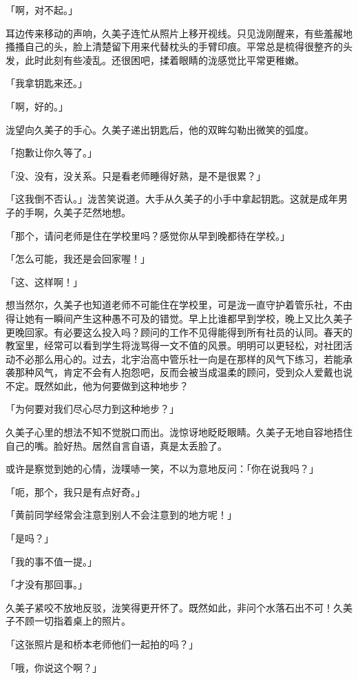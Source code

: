 \documentclass[UTF8]{ctexart}
\begin{document}
    「啊，对不起。」 

    耳边传来移动的声响，久美子连忙从照片上移开视线。只见泷刚醒来，有些羞赧地搔搔自己的头，脸上清楚留下用来代替枕头的手臂印痕。平常总是梳得很整齐的头发，此时此刻有些凌乱。还很困吧，揉着眼睛的泷感觉比平常更稚嫩。 

    「我拿钥匙来还。」 

    「啊，好的。」 

    泷望向久美子的手心。久美子递出钥匙后，他的双眸勾勒出微笑的弧度。 

    「抱歉让你久等了。」 

    「没、没有，没关系。只是看老师睡得好熟，是不是很累？」 

    「这我倒不否认。」泷苦笑说道。大手从久美子的小手中拿起钥匙。这就是成年男子的手啊，久美子茫然地想。 

    「那个，请问老师是住在学校里吗？感觉你从早到晚都待在学校。」 

    「怎么可能，我还是会回家喔！」 

    「这、这样啊！」 

    想当然尔，久美子也知道老师不可能住在学校里，可是泷一直守护着管乐社，不由得让她有一瞬间产生这种愚不可及的错觉。早上比谁都早到学校，晚上又比久美子更晚回家。有必要这么投入吗？顾问的工作不见得能得到所有社员的认同。春天的教室里，经常可以看到学生将泷骂得一文不值的风景。明明可以更轻松，对社团活动不必那么用心的。过去，北宇治高中管乐社一向是在那样的风气下练习，若能承袭那种风气，肯定不会有人抱怨吧，反而会被当成温柔的顾问，受到众人爱戴也说不定。既然如此，他为何要做到这种地步？ 

    「为何要对我们尽心尽力到这种地步？」 

    久美子心里的想法不知不觉脱口而出。泷惊讶地眨眨眼睛。久美子无地自容地捂住自己的嘴。脸好热。居然自言自语，真是太丢脸了。 

    或许是察觉到她的心情，泷噗哧一笑，不以为意地反问：「你在说我吗？」 

    「呃，那个，我只是有点好奇。」 

    「黄前同学经常会注意到别人不会注意到的地方呢！」 

    「是吗？」 

    「我的事不值一提。」 

    「才没有那回事。」 

    久美子紧咬不放地反驳，泷笑得更开怀了。既然如此，非问个水落石出不可！久美子不顾一切指着桌上的照片。 

    「这张照片是和桥本老师他们一起拍的吗？」 

    「哦，你说这个啊？」 
\end{document}
